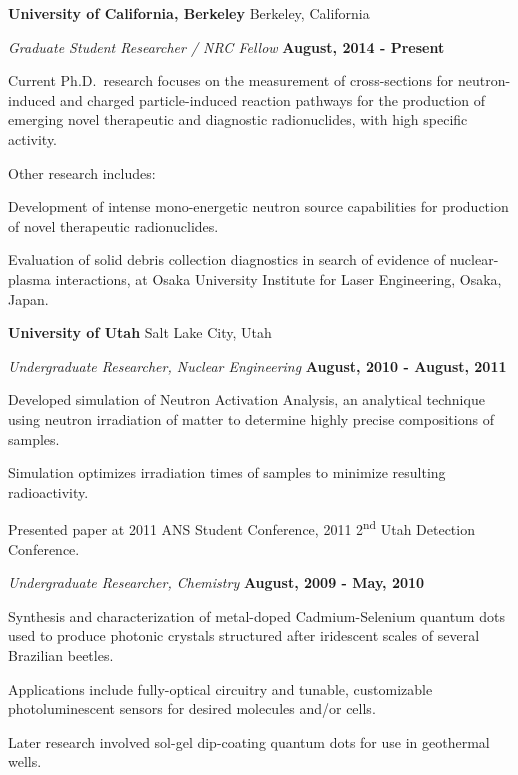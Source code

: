
{\bf University of California, Berkeley} \hfill{ Berkeley, California}

\vspace*{-.05in}
{\em Graduate Student Researcher / NRC Fellow} \hfill {\bf August, 2014 - Present}

\begin{list1}
\item[] Current Ph.D.~research focuses on the measurement of cross-sections for neutron-induced and charged particle-induced reaction pathways for the production of emerging novel therapeutic and diagnostic radionuclides, with high specific activity.  
\item[] Other research includes: 
\begin{list2}
\item[] Development of intense mono-energetic neutron source capabilities for production of novel therapeutic radionuclides.
\item[] Evaluation of solid debris collection diagnostics in search 
of evidence of nuclear-plasma interactions, at Osaka University Institute for Laser Engineering, Osaka, Japan.
\end{list2}
\end{list1}





{\bf University of Utah} \hfill{ Salt Lake City, Utah}

\vspace*{-.05in}
{\em Undergraduate Researcher, Nuclear Engineering} \hfill {\bf August, 2010 - August, 2011}

\begin{list1}
\item[] Developed simulation of Neutron Activation Analysis, an analytical technique using neutron
irradiation of matter to determine highly precise compositions of samples.
\item[] Simulation optimizes irradiation times of samples to minimize resulting radioactivity.
\item[] Presented paper at 2011 ANS Student Conference, 2011 2\textsuperscript{nd} Utah
Detection Conference.
\end{list1}


{\em Undergraduate Researcher, Chemistry} \hfill {\bf August, 2009 - May, 2010}

\begin{list1}
\item[] Synthesis and characterization of metal-doped Cadmium-Selenium quantum dots used to produce
photonic crystals structured after iridescent scales of several Brazilian beetles.
\item[] Applications include fully-optical circuitry and tunable, customizable photoluminescent sensors for
desired molecules and/or cells.
\item[] Later research involved sol-gel dip-coating quantum dots for use in geothermal wells.
\end{list1}


